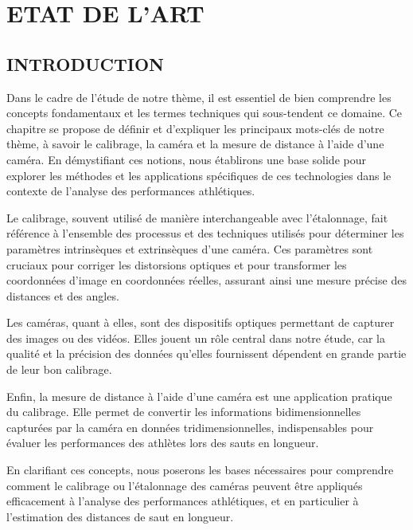 \chapter{ETAT DE L'ART}
\begin{spacing}{1.2}
\minitoc
\thispagestyle{MyStyle}
\end{spacing}
\newpage

\section{INTRODUCTION}


Dans le cadre de l'étude de notre thème, il est essentiel de bien comprendre les concepts fondamentaux et les termes techniques qui sous-tendent ce domaine. Ce chapitre se propose de définir et d'expliquer les principaux mots-clés de notre thème, à savoir le calibrage, la caméra et la mesure de distance à l'aide d'une caméra. En démystifiant ces notions, nous établirons une base solide pour explorer les méthodes et les applications spécifiques de ces technologies dans le contexte de l'analyse des performances athlétiques.

Le calibrage, souvent utilisé de manière interchangeable avec l'étalonnage, fait référence à l'ensemble des processus et des techniques utilisés pour déterminer les paramètres intrinsèques et extrinsèques d'une caméra. Ces paramètres sont cruciaux pour corriger les distorsions optiques et pour transformer les coordonnées d'image en coordonnées réelles, assurant ainsi une mesure précise des distances et des angles.

Les caméras, quant à elles, sont des dispositifs optiques permettant de capturer des images ou des vidéos. Elles jouent un rôle central dans notre étude, car la qualité et la précision des données qu'elles fournissent dépendent en grande partie de leur bon calibrage.  

Enfin, la mesure de distance à l'aide d'une caméra est une application pratique du calibrage. Elle permet de convertir les informations bidimensionnelles capturées par la caméra en données tridimensionnelles, indispensables pour évaluer les performances des athlètes lors des sauts en longueur.  

En clarifiant ces concepts, nous poserons les bases nécessaires pour comprendre comment le calibrage ou l'étalonnage des caméras peuvent être appliqués efficacement à l'analyse des performances athlétiques, et en particulier à l'estimation des distances de saut en longueur.



